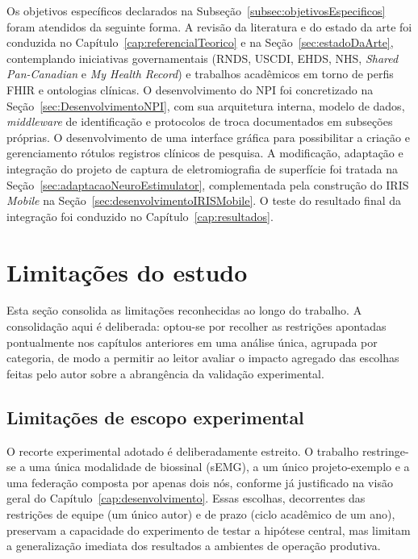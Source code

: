 Os objetivos específicos declarados na Subseção~\ref{subsec:objetivosEspecificos} foram atendidos da seguinte forma. A revisão da literatura e do estado da arte foi conduzida no Capítulo~\ref{cap:referencialTeorico} e na Seção~\ref{sec:estadoDaArte}, contemplando iniciativas governamentais (RNDS, USCDI, EHDS, NHS, \textit{Shared Pan-Canadian} e \textit{My Health Record}) e trabalhos acadêmicos em torno de perfis FHIR e ontologias clínicas. O desenvolvimento do NPI foi concretizado na Seção~\ref{sec:DesenvolvimentoNPI}, com sua arquitetura interna, modelo de dados, \textit{middleware} de identificação e protocolos de troca documentados em subseções próprias. O desenvolvimento de uma interface gráfica para possibilitar a criação e gerenciamento rótulos registros clínicos de pesquisa. A modificação, adaptação e integração do projeto de captura de eletromiografia de superfície foi tratada na Seção~\ref{sec:adaptacaoNeuroEstimulator}, complementada pela construção do IRIS \textit{Mobile} na Seção~\ref{sec:desenvolvimentoIRISMobile}. O teste do resultado final da integração foi conduzido no Capítulo~\ref{cap:resultados}.

\section{Limitações do estudo}\label{sec:limitacoesEstudo}

Esta seção consolida as limitações reconhecidas ao longo do trabalho. A consolidação aqui é deliberada: optou-se por recolher as restrições apontadas pontualmente nos capítulos anteriores em uma análise única, agrupada por categoria, de modo a permitir ao leitor avaliar o impacto agregado das escolhas feitas pelo autor sobre a abrangência da validação experimental.

\subsection{Limitações de escopo experimental}\label{subsec:limitacoesEscopo}

O recorte experimental adotado é deliberadamente estreito. O trabalho restringe-se a uma única modalidade de biossinal (sEMG), a um único projeto-exemplo e a uma federação composta por apenas dois nós, conforme já justificado na visão geral do Capítulo~\ref{cap:desenvolvimento}. Essas escolhas, decorrentes das restrições de equipe (um único autor) e de prazo (ciclo acadêmico de um ano), preservam a capacidade do experimento de testar a hipótese central, mas limitam a generalização imediata dos resultados a ambientes de operação produtiva.

